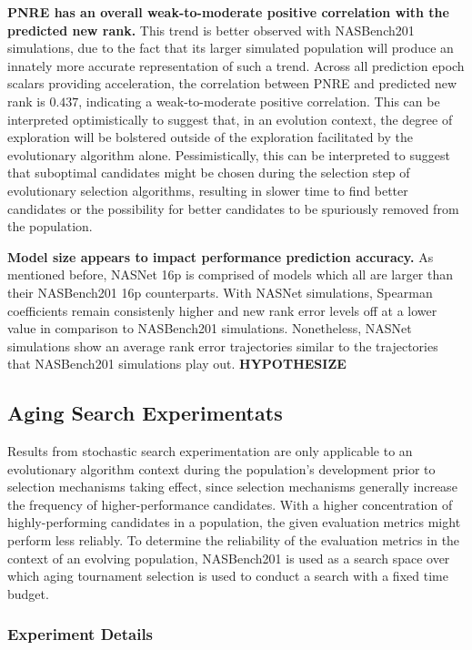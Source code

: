 \documentclass[twocolumn]{article}
\begin{document}
\textbf{PNRE has an overall weak-to-moderate positive correlation with the predicted new rank.}
This trend is better observed with NASBench201 simulations, due to the fact that its larger simulated population will produce an innately more accurate
representation of such a trend. 
Across all prediction epoch scalars providing acceleration, the correlation between PNRE and predicted new rank is $0.437$,
indicating a weak-to-moderate positive correlation. 
This can be interpreted optimistically to suggest that, in an evolution context, the degree of exploration will be bolstered
outside of the exploration facilitated by the evolutionary algorithm alone. 
Pessimistically, this can be interpreted to suggest that suboptimal candidates might be chosen during the selection step of
evolutionary selection algorithms, resulting in slower time to find better candidates or the possibility for better candidates
to be spuriously removed from the population.

\textbf{Model size appears to impact performance prediction accuracy.} 
As mentioned before, NASNet 16p is comprised of models which all are larger than their NASBench201 16p counterparts.
With NASNet simulations, Spearman coefficients remain consistenly higher and new rank error levels off at a lower value in comparison to NASBench201 simulations.
Nonetheless, NASNet simulations show an average rank error trajectories similar to the trajectories that NASBench201 simulations play out.
\textbf{HYPOTHESIZE}

\subsection{Aging Search Experimentats}

Results from stochastic search experimentation are only applicable to an evolutionary algorithm context during the population's development prior to 
selection mechanisms taking effect, since selection mechanisms generally increase the frequency of higher-performance candidates. 
With a higher concentration of highly-performing candidates in a population, the given evaluation metrics might perform less reliably.
To determine the reliability of the evaluation metrics in the context of an evolving population, NASBench201 is used as a search space
over which aging tournament selection \cite{amoebanet} is used to conduct a search with a fixed time budget.

\subsubsection{Experiment Details}
\end{document}
